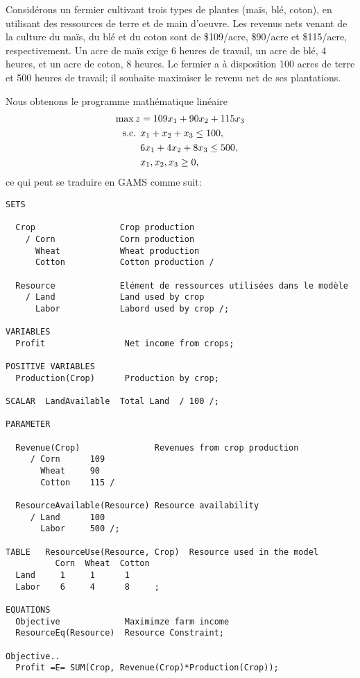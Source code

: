 \begin{example}
Considérons un fermier cultivant trois types de plantes (maïs, blé, coton), en utilisant des ressources de terre et de main d'oeuvre.
Les revenus nets venant de la culture du maïs, du blé et du coton sont de \$109/acre, \$90/acre et \$115/acre, respectivement.
Un acre de maïs exige 6 heures de travail, un acre de blé, 4 heures, et un acre de coton, 8 heures.
Le fermier a à disposition 100 acres de terre et 500 heures de travail; il souhaite maximiser le revenu net de ses plantations.

Nous obtenons le programme mathématique linéaire
\begin{align*}
\max z &= 109x_1+90x_2+115x_3 \\
\mbox{s.c. } & x_1 + x_2 + x_3 \leq 100, \\
& 6x_1 + 4x_2 + 8x_3 \leq 500, \\
& x_1, x_2, x_3 \geq 0,
\end{align*}
ce qui peut se traduire en GAMS comme suit:
\begin{verbatim}
SETS

  Crop                 Crop production
    / Corn             Corn production
      Wheat            Wheat production
      Cotton           Cotton production /

  Resource             Elément de ressources utilisées dans le modèle
    / Land             Land used by crop
      Labor            Labord used by crop /;

VARIABLES
  Profit                Net income from crops;

POSITIVE VARIABLES
  Production(Crop)      Production by crop;

SCALAR  LandAvailable  Total Land  / 100 /;

PARAMETER

  Revenue(Crop)               Revenues from crop production
     / Corn      109
       Wheat     90
       Cotton    115 /

  ResourceAvailable(Resource) Resource availability
     / Land      100
       Labor     500 /;

TABLE   ResourceUse(Resource, Crop)  Resource used in the model
          Corn  Wheat  Cotton
  Land     1     1      1
  Labor    6     4      8     ;

EQUATIONS
  Objective             Maximimze farm income
  ResourceEq(Resource)  Resource Constraint;

Objective..
  Profit =E= SUM(Crop, Revenue(Crop)*Production(Crop));


\end{verbatim}
\end{example}
